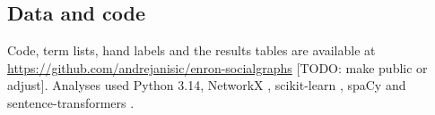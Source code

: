 \documentclass[9pt,twocolumn,twoside]{pnas-new}
\begin{document}
\subsection*{Data and code}
Code, term lists, hand labels and the results tables are available at
\url{https://github.com/andrejanisic/enron-socialgraphs} [TODO: make public or adjust].
Analyses used Python 3.14, NetworkX \cite{hagberg2008}, scikit-learn \cite{pedregosa2011},
spaCy \cite{spacy} and sentence-transformers \cite{reimers2019}.

\showacknow{}


\end{document}
